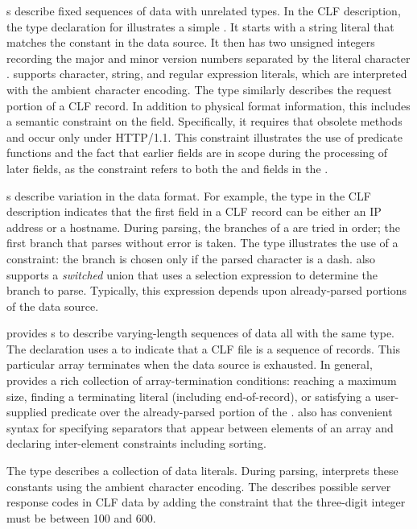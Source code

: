 \documentclass[11pt]{article}
\begin{document}
s describe fixed sequences of data with unrelated types.
In the CLF description, the type declaration for
 illustrates a simple . It starts with a 
string literal that matches the constant  in the data source.  It 
then has two unsigned integers recording the major and minor version numbers
separated by the literal character .  \pads{} supports character, string,
and regular expression literals, which are interpreted with the ambient character 
encoding. The type  
similarly describes the request portion of a CLF record.  In addition
to physical format information, this  includes a semantic constraint
on the  field.  Specifically, it requires that obsolete methods
 and  occur only under HTTP/1.1.  This constraint illustrates
the use of predicate functions and the fact 
that earlier fields are in scope during the processing of later fields, as the 
constraint
refers to both the  and  fields in the .

s describe variation in the data format.  For example, the
 type in the CLF description indicates that the first
field in a CLF record can be either an IP address or a hostname.
During parsing, the branches of a  are tried in order; the
first branch that parses without error is taken.  The 
type illustrates the use of a constraint: the branch 
is chosen only if the parsed character is a dash.  \pads{} also
supports a \textit{switched} union that uses a selection expression to
determine the branch to parse.  Typically, this expression depends
upon already-parsed portions of the data source.

\pads{} provides s to describe varying-length sequences of
data all with the same type.  The  declaration  uses a
 to indicate that a CLF file is a sequence of 
records.  This particular array terminates when the data source is
exhausted. In general, \pads{} provides a rich
collection of array-termination conditions: reaching a maximum size,
finding a terminating literal (including end-of-record), or satisfying a
user-supplied predicate over the already-parsed portion of the . 
\pads{} also has convenient syntax for 
specifying separators that appear between elements of an array and
declaring inter-element constraints including sorting.

The
 type  describes a collection of data literals.
During parsing, \pads{} interprets these constants using the ambient
character encoding.  The   describes
possible server response codes in CLF data by adding the constraint
that the three-digit integer must be between 100 and 600.
\end{document}
